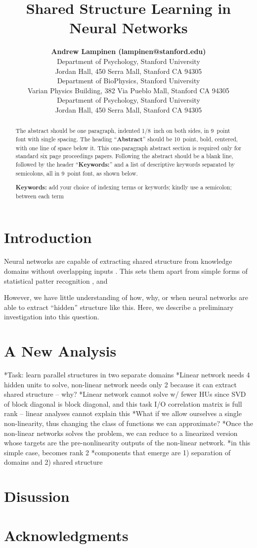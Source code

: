 \documentclass[10pt,letterpaper]{article}
\title{Shared Structure Learning in Neural Networks}
\author{{\large \bf Andrew Lampinen (lampinen@stanford.edu)} \\
  Department of Psychology, Stanford University \\
  Jordan Hall, 450 Serra Mall, Stanford CA 94305 
  \AND {\large \bf Shaw Hsu (cshawhsu@stanford.edu)} \\
  Department of BioPhysics, Stanford University \\
  Varian Physics Building, 382 Via Pueblo Mall, Stanford CA 94305
  \AND {\large \bf James L. McClelland (mcclelland@stanford.edu)} \\
  Department of Psychology, Stanford University \\
  Jordan Hall, 450 Serra Mall, Stanford CA 94305}
\begin{document}
\maketitle


\begin{abstract}
The abstract should be one paragraph, indented 1/8~inch on both sides,
in 9~point font with single spacing. The heading ``{\bf Abstract}''
should be 10~point, bold, centered, with one line of space below
it. This one-paragraph abstract section is required only for standard
six page proceedings papers. Following the abstract should be a blank
line, followed by the header ``{\bf Keywords:}'' and a list of
descriptive keywords separated by semicolons, all in 9~point font, as
shown below.

\textbf{Keywords:} 
add your choice of indexing terms or keywords; kindly use a
semicolon; between each term
\end{abstract}


\section{Introduction}
Neural networks are capable of extracting shared structure from knowledge domains without overlapping inputs \cite{Hinton1986}. This sets them apart from simple forms of statistical patter recognition \cite{Rogers2008}, and  \par
However, we have little understanding of how, why, or when neural networks are able to extract ``hidden'' structure like this. Here, we describe a preliminary investigation into this question. 
\section{A New Analysis}
*Task: learn parallel structures in two separate domains
    *Linear network needs 4 hidden units to solve, non-linear network needs only 2 because it can extract shared structure -- why?
*Linear network cannot solve w/ fewer HUs since SVD of block diagonal is block diagonal, and this task I/O correlation matrix is full rank -- linear analyses cannot explain this
*What if we allow ourselves a single non-linearity, thus changing the class of functions we can approximate?
*Once the non-linear networks solves the problem, we can reduce to a linearized version whose targets are the pre-nonlinearity outputs of the non-linear network.
*in this simple case, becomes rank 2
    *components that emerge are 1) separation of domains and 2) shared structure 




\section{Disussion}

\section{Acknowledgments}



\setlength{\bibleftmargin}{.125in}
\setlength{\bibindent}{-\bibleftmargin}


\end{document}
